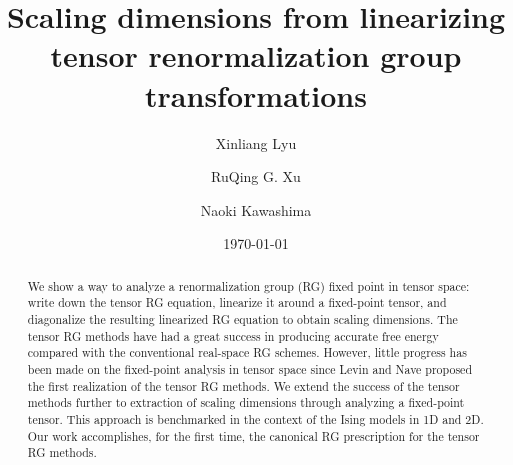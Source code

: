 \documentclass[aps,prr,reprint,superscriptaddress,floatfix]{revtex4-2}
\begin{document}

\title{Scaling dimensions from linearizing tensor renormalization group transformations}



\author{Xinliang Lyu} 
 \author{RuQing G. Xu}
 \author{Naoki Kawashima}
     

\date{\today}

\begin{abstract} 
    We show a way to analyze a renormalization group (RG) fixed point in tensor space: write down the tensor RG equation, linearize it around a fixed-point tensor, and diagonalize the resulting linearized RG equation to obtain scaling dimensions. 
    The tensor RG methods have had a great success in producing accurate free energy compared with the conventional real-space RG schemes.
    However, little progress has been made on the fixed-point analysis in tensor space since Levin and Nave proposed the first realization of the tensor RG methods.
    We extend the success of the tensor methods further to extraction of scaling dimensions through analyzing a fixed-point tensor.
    This approach is benchmarked in the context of the Ising models in 1D and 2D.
    Our work accomplishes, for the first time, the canonical RG prescription for the tensor RG methods.
\end{abstract}
\end{document}
